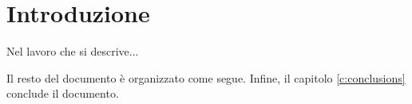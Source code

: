 \chapter{Introduzione}\label{c:introduction}

Nel lavoro che si descrive...

Il resto del documento è organizzato come segue.
Infine, il capitolo \ref{c:conclusions} conclude il documento.
